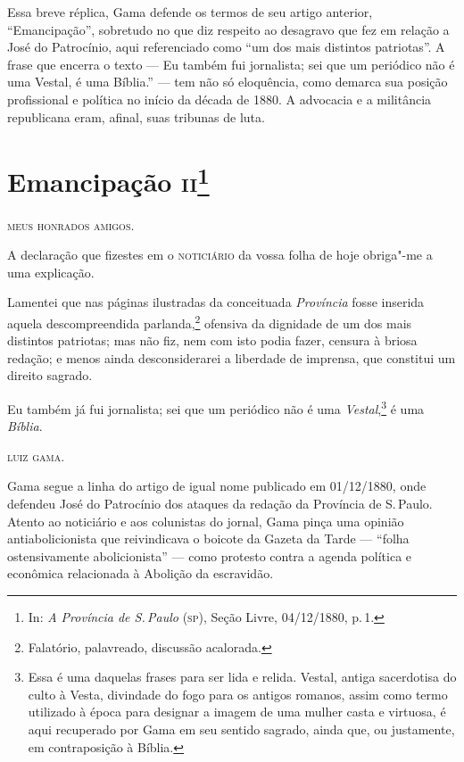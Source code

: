 \paginabranca
\mbox{}\vfill
\thispagestyle{empty}

{\small\noindent
Essa breve réplica, Gama defende os termos de seu artigo anterior,
``Emancipação'', sobretudo no que diz respeito ao desagravo que fez em
relação a José do Patrocínio, aqui referenciado como ``um dos mais
distintos patriotas''. A frase que encerra o texto --- Eu também fui
jornalista; sei que um periódico não é uma Vestal, é uma Bíblia.'' --- tem
não só eloquência, como demarca sua posição profissional e política no
início da década de 1880. A advocacia e a militância republicana eram,
afinal, suas tribunas de luta.}

\chapter{Emancipação \textsc{ii}\footnote[*]{In: \emph{A Província de S.\,Paulo} (\textsc{sp}), Seção Livre, 04/12/1880, p.\,1.}} %


\textsc{meus honrados amigos.}

A declaração que fizestes em o \textsc{noticiário} da vossa folha de hoje
obriga"-me a uma explicação.

Lamentei que nas páginas ilustradas da conceituada \emph{Província}
fosse inserida aquela descompreendida parlanda,\footnote{Falatório,
  palavreado, discussão acalorada.} ofensiva da dignidade de um dos mais
distintos patriotas; mas não fiz, nem com isto podia fazer, censura à
briosa redação; e menos ainda desconsiderarei a liberdade de imprensa,
que constitui um direito sagrado.

Eu também já fui jornalista; sei que um periódico não é uma
\emph{Vestal},\footnote{Essa é uma daquelas frases para ser lida e relida.
  Vestal, antiga sacerdotisa do culto à Vesta, divindade do fogo para os
  antigos romanos, assim como termo utilizado à época para designar a
  imagem de uma mulher casta e virtuosa, é aqui recuperado por Gama em
  seu sentido sagrado, ainda que, ou justamente, em contraposição à
  Bíblia.} é uma
\emph{Bíblia}.

\bigskip

\hfill\textsc{luiz gama.}

\pagebreak
\mbox{}\vfill
\thispagestyle{empty}

{\small\noindent
Gama segue a linha do artigo de igual nome publicado em
01/12/1880, onde defendeu José do Patrocínio dos ataques da redação da
Província de S.\,Paulo. Atento ao noticiário e aos colunistas do jornal,
Gama pinça uma opinião antiabolicionista que reivindicava o boicote da
Gazeta da Tarde --- ``folha ostensivamente abolicionista'' --- como protesto
contra a agenda política e econômica relacionada à Abolição da
escravidão.} 

